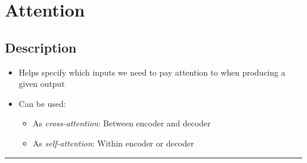 \section{Attention}
\subsection*{Description}
\begin{itemize}
    \item Helps specify which inputs we need to pay attention to when producing a given output
    \item Can be used:
    \begin{itemize}
        \item As \emph{cross-attention}: Between encoder and decoder
        \item As \emph{self-attention}: Within encoder or decoder
    \end{itemize}
\end{itemize}

{\color{black}\hrule height 0.001mm}

